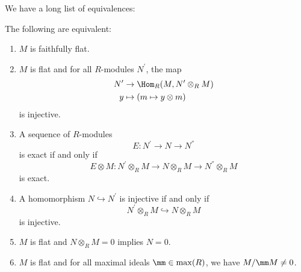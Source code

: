 \documentclass[11pt, english]{article}
\begin{document}
We have a long list of equivalences:
\begin{prop}
The following are equivalent:
\begin{enumerate}
\item
$M$ is faithfully flat.
\item
$M$ is flat and for all $R$-modules $N^\prime$, the map
\begin{align*}
N^\prime &\to \Hom_R(M, N^\prime \otimes_R M) \\
y &\mapsto (m \mapsto y \otimes m)
\end{align*}
is injective.
\item
A sequence of $R$-modules
\[
E: N^\prime \to N \to N^{\dprime}
\]
is exact if and only if
\[
E \otimes M: N^\prime \otimes_R M \to N \otimes_R M \to N^\dprime \otimes_R M
\]
is exact.
\item
A homomorphism $N \hookrightarrow N^\prime$ is injective if and only if \[N^\prime \otimes_R M \hookrightarrow N \otimes_R M\] is injective.
\item
$M$ is flat and $N \otimes_R M=0$ implies $N=0$.
\item
$M$ is flat and for all maximal ideals $\mm \in \max(R)$, we have $M/\mm M \neq 0$.
\end{enumerate}
\end{prop}
\end{document}

